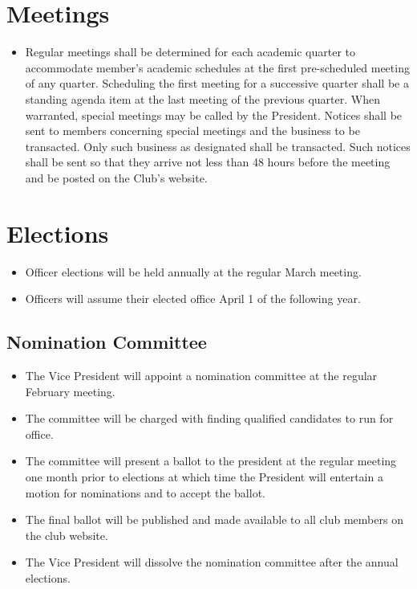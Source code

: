 \documentclass{article}
\begin{document}
\section{Meetings}
\begin{itemize}
\item Regular meetings shall be determined for each academic quarter to accommodate member's academic schedules at the first pre-scheduled meeting of any quarter. Scheduling the first meeting for a successive quarter shall be a standing agenda item at the last meeting of the previous quarter. When warranted, special meetings may be called by the President. Notices shall be sent to members concerning special meetings and the business to be transacted. Only such business as designated shall be transacted. Such notices shall be sent so that they arrive not less than 48 hours before the meeting and be posted on the Club's website.
\end{itemize}

\section{Elections}
\begin{itemize}
\item Officer elections will be held annually at the regular March meeting.

\item Officers will assume their elected office April 1 of the following year.
\end{itemize}

\subsection{Nomination Committee}
\begin{itemize}
\item The Vice President will appoint a nomination committee at the regular February meeting.

\item The committee will be charged with finding qualified candidates to run for office.

\item The committee will present a ballot to the president at the regular meeting one month prior to elections at which time the President will entertain a motion for nominations and to accept the ballot.

\item The final ballot will be published and made available to all club members on the club website.

\item The Vice President will dissolve the nomination committee after the annual elections.
\end{itemize}
\end{document}
